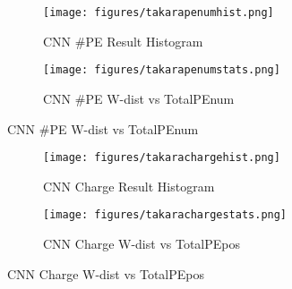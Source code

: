 \begin{figure}[H]
\begin{minipage}{.5\textwidth}
\begin{figure}[H]
    \centering
        \texttt{[image: figures/takarapenumhist.png]}
    \caption{CNN \#PE Result Histogram}
\end{figure}
\end{minipage}
\begin{minipage}{.5\textwidth}
\begin{figure}[H]
    \centering
        \texttt{[image: figures/takarapenumstats.png]}
    \caption{CNN \#PE W-dist vs TotalPEnum}
\end{figure}
\end{minipage}
\end{figure}
\begin{figure}[H]
\begin{minipage}{.5\textwidth}
\begin{figure}[H]
    \centering
        \texttt{[image: figures/takarachargehist.png]}
    \caption{CNN Charge Result Histogram}
\end{figure}
\end{minipage}
\begin{minipage}{.5\textwidth}
\begin{figure}[H]
    \centering
        \texttt{[image: figures/takarachargestats.png]}
    \caption{CNN Charge W-dist vs TotalPEpos}
\end{figure}
\end{minipage}
\end{figure}

